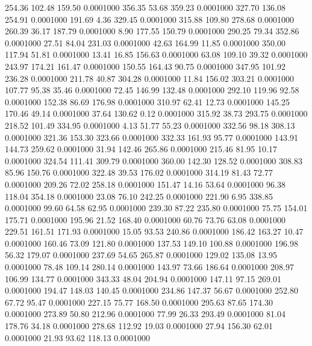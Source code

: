 254.36  102.48  159.50   0.0001000
 356.35   53.68  359.23   0.0001000
 327.70  136.08  254.91   0.0001000
 191.69    4.36  329.45   0.0001000
 315.88  109.80  278.68   0.0001000
 260.39   36.17  187.79   0.0001000
   8.90  177.55  150.79   0.0001000
 290.25   79.34  352.86   0.0001000
  27.51   84.04  231.03   0.0001000
  42.63  164.99   11.85   0.0001000
 350.00  117.94   51.81   0.0001000
  13.41   16.85  156.63   0.0001000
  63.08  109.10   39.32   0.0001000
 243.97  174.21  161.47   0.0001000
 150.55  164.43   90.75   0.0001000
 347.95  101.92  236.28   0.0001000
 211.78   40.87  304.28   0.0001000
  11.84  156.02  303.21   0.0001000
 107.77   95.38   35.46   0.0001000
  72.45  146.99  132.48   0.0001000
 292.10  119.96   92.58   0.0001000
 152.38   86.69  176.98   0.0001000
 310.97   62.41   12.73   0.0001000
 145.25  170.46   49.14   0.0001000
  37.64  130.62    0.12   0.0001000
 315.92   38.73  293.75   0.0001000
 218.52  101.49  334.95   0.0001000
   4.13   51.77   55.23   0.0001000
 332.56   98.18  308.13   0.0001000
 321.36  153.30  323.66   0.0001000
 332.33  161.93   95.77   0.0001000
 143.91  144.73  259.62   0.0001000
  31.94  142.46  265.86   0.0001000
 215.46   81.95   10.17   0.0001000
 324.54  111.41  309.79   0.0001000
 360.00  142.30  128.52   0.0001000
 308.83   85.96  150.76   0.0001000
 322.48   39.53  176.02   0.0001000
 314.19   81.43   72.77   0.0001000
 209.26   72.02  258.18   0.0001000
 151.47   14.16   53.64   0.0001000
  96.38  118.04  354.18   0.0001000
  23.08   76.10  242.25   0.0001000
 221.90    6.95  338.85   0.0001000
  99.60   64.58   62.95   0.0001000
 239.30   87.22  235.80   0.0001000
  75.75  154.01  175.71   0.0001000
 195.96   21.52  168.40   0.0001000
  60.76   73.76   63.08   0.0001000
 229.51  161.51  171.93   0.0001000
  15.05   93.53  240.86   0.0001000
 186.42  163.27   10.47   0.0001000
 160.46   73.09  121.80   0.0001000
 137.53  149.10  100.88   0.0001000
 196.98   56.32  179.07   0.0001000
 237.69   54.65  265.87   0.0001000
 129.02  135.08   13.95   0.0001000
  78.48  109.14  280.14   0.0001000
 143.97   73.66  186.64   0.0001000
 208.97  106.99  134.77   0.0001000
 343.33   48.04  204.94   0.0001000
 147.11   97.15  269.01   0.0001000
 194.47  148.03  140.45   0.0001000
 234.86  147.37   56.67   0.0001000
 252.80   67.72   95.47   0.0001000
 227.15   75.77  168.50   0.0001000
 295.63   87.65  174.30   0.0001000
 273.89   50.80  212.96   0.0001000
  77.99   26.33  293.49   0.0001000
  81.04  178.76   34.18   0.0001000
 278.68  112.92   19.03   0.0001000
  27.94  156.30   62.01   0.0001000
  21.93   93.62  118.13   0.0001000
